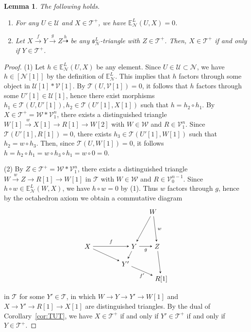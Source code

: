 \documentclass[a4paper,reqno,10pt]{amsart}
\newtheorem{lemma}[lemma]{Lemma}
\theoremstyle{definition}
\theoremstyle{definition}
\theoremstyle{definition}
\theoremstyle{definition}
\theoremstyle{plain}
\newcommand{\fs}{\mathfrak{s}}
\newcommand{\BE}{\mathbb{E}}
\newcommand{\CN}{\mathcal{N}}
\newcommand{\CT}{\mathcal{T}}
\newcommand{\CU}{\mathcal{U}}
\newcommand{\CV}{\mathcal{V}}
\newcommand{\CW}{\mathcal{W}}
\begin{document}
\begin{lemma}\label{lem:merged}
The following holds.
\begin{enumerate}
\item For any $U\in\CU$ and $X\in\CT^+$, we have $\BE^L_{\CN}(U,X)=0$.
\item Let $X\xrightarrow{f}Y\xrightarrow{g}Z\overset{h}{\dashrightarrow}$ be any $\fs^L_{\CN}$-triangle with $Z\in\CT^+$. Then, $X\in\CT^+$ if and only if $Y\in\CT^+$.
\end{enumerate}
\end{lemma}
\begin{proof}
{\rm (1)} Let $h\in\BE^L_{\CN}(U,X)$ be any element. Since $U\in\CU\subset\CN$, we have $h\in[\CN[1]]$ by the definition of $\BE^L_{\CN}$. This implies that $h$ factors through some object  in $\CU[1]\ast\CV[1]$. By $\CT(U,\CV[1])=0$, it follows that $h$ factors through some $U'[1]\in\CU[1]$, hence there exist morphisms $h_1\in \CT(U,U'[1]),h_2\in\CT(U'[1],X[1])$ such that $h=h_2\circ h_1$. By $X\in\CT^+=\CW\ast\CV_1^{n}$, there exists a distinguished triangle $W[1]\xrightarrow{w} X[1]\to R[1]\to W[2]$ with $W\in\CW$ and $R\in\CV_1^n$. Since $\CT(U'[1],R[1])=0$, there exists $h_3\in\CT(U'[1],W[1])$ such that $h_2=w\circ h_3$. Then, since $\CT(U,W[1])=0$, it  follows $h=h_2\circ h_1=w\circ h_3\circ h_1=w\circ 0=0$. 

{\rm (2)} By $Z\in\CT^+=\CW\ast\CV_1^{n}$, there exists a distinguished triangle $W\xrightarrow{w}Z\to R[1]\to W[1]$ in $\CT$ with $W\in\CW$  and $R\in\CV_0^{n-1}$. Since $h\circ w\in\BE^L_{\CN}(W,X)$, we have $h\circ w=0$ by {\rm (1)}. Thus $w$ factors through $g$, hence by the octahedron axiom we obtain a commutative diagram 
\[
\begin{tikzpicture}[>=stealth]
\node (1) at (0.98,1.8) {$W$};
\node (2) at (1.19,0) {$Z$};
\node (3) at (1.4,-1.7) {$R[1]$};
\node (4) at (0,0) {$Y$};
\node (5) at (-0.45,-0.9) {$Y'$};
\node (6) at (-2.4,0) {$X$};
\draw[->] (1) -- node[right,font=\scriptsize] {$w$} (2);
\draw[->] (1) -- node[right,font=\scriptsize] {} (4);
\draw[->] (2) -- node[left,font=\scriptsize] {} (3);
\draw[->] (4) -- node[below,font=\scriptsize] {$g$} (2);
\draw[->] (5) -- node[below,font=\scriptsize] {$f'$} (3);
\draw[->] (4) -- node[left,font=\scriptsize] {} (5);
\draw[->] (6) -- node[above,font=\scriptsize] {$f$} (4);
\draw[->] (6) -- node[below,font=\scriptsize] {} (5);
\end{tikzpicture}
\]
in $\CT$ for some $Y'\in \CT$, in which $W\to Y\to Y'\to W[1]$ and $X\to Y'\to R[1]\to X[1]$ are distinguished triangles. By the dual of Corollary~\ref{cor:TUT}, we have $X\in\CT^+$ if and only if $Y'\in\CT^+$ if and only if $Y\in\CT^+$.
\end{proof}
\end{document}
